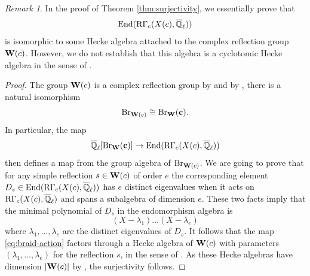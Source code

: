 \documentclass[article, 10pt, oneside, reqno]{amsart}
\theoremstyle{plain}
\theoremstyle{definition}
\theoremstyle{remark}
\newtheorem{rque}[thm]{Remark}
\newcommand{\cbf}{\mathbf{c}}
\begin{document}
\begin{rque}
In the proof of Theorem \ref{thm:surjectivity}, we essentially prove that
\[\mathrm{End}(\mathrm{R\Gamma}_c(X(c), \overline{\mathbb{Q}}_{\ell}))\]
is isomorphic to some Hecke algebra attached to the complex reflection group $\mathbf{W}(c)$. However, we do not establish that this algebra is a cyclotomic Hecke algebra in the sense of \cite{BroueMalleCyclotomicHeckeAlg}. 
\end{rque}

\begin{proof}
The group $\mathbf{W}(c)$ is a complex reflection group by \cite{SpringerRegularElements} and by \cite{Bessis}, there is a natural isomorphism 
$$\Br_{\Wbf(c)} \cong \Br_{\Wbf}(\cbf).$$
In particular, the map 
\begin{equation}\label{eq:braid-action}
\Qlb[\Br_{\Wbf}(\cbf)] \to \End(\RGamma_c(X(c), \Qlb))
\end{equation}
then defines a map from the group algebra of $\mathrm{Br}_{\mathbf{W}(c)}$. We are going to prove that for any simple reflection $s \in \mathbf{W}(c)$ of order $e$ the corresponding element $D_s \in \mathrm{End}(\mathrm{R\Gamma}_c(X(c), \overline{\mathbb{Q}}_{\ell}))$ has $e$ distinct eigenvalues when it acts on $\mathrm{R\Gamma}_c(X(c), \overline{\mathbb{Q}}_{\ell})$ and spans a subalgebra of dimension $e$. These two facts imply that the minimal polynomial of $D_s$ in the endomorphism algebra is 
$$(X - \lambda_1)\dots (X - \lambda_e)$$
where $\lambda_1, \dots, \lambda_e$ are the distinct eigenvalues of $D_s$. It follows that the map \eqref{eq:braid-action} factors through a Hecke algebra of $\mathbf{W}(c)$ with parameters $(\lambda_1, \dots, \lambda_e)$ for the reflection $s$, in the sense of \cite{BroueMalleCyclotomicHeckeAlg}. As these Hecke algebras have dimension $|\mathbf{W}(c)|$ by \cite[4.C]{BroueMalleRouquier}, the surjectivity follows. 


\end{proof}
\end{document}
